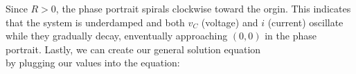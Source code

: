 \documentclass[preview]{standalone}
\begin{document}
\begin{center}
\raggedright
                    Since $R > 0$, the phase portrait spirals clockwise toward the orgin. This indicates
                    that the system is underdamped and both $v_C$ (voltage) and $i$ (current) oscillate 
                    while they gradually decay, enventually approaching $(0,0)$ in the phase portrait.
                    Lastly, we can create our general solution equation \\
                    by plugging our values into the equation:
\end{center}
\end{document}

